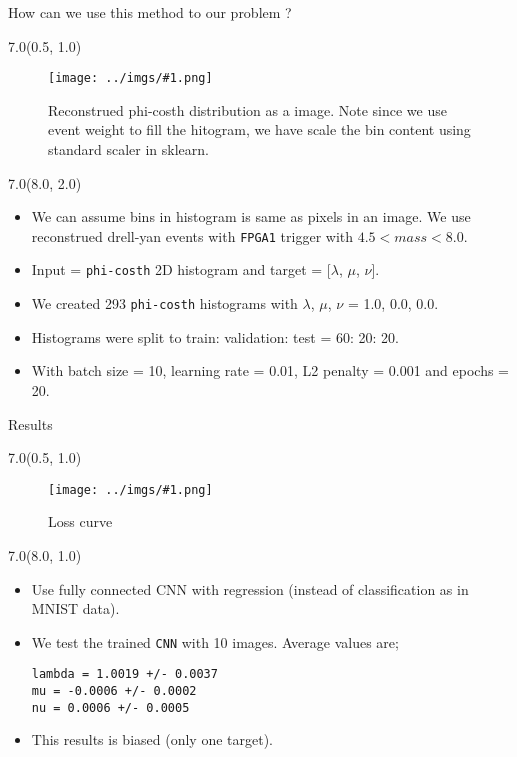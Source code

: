\documentclass[10pt, xcolor={dvipsnames}, aspectratio = 169, sans,mathserif]{beamer}
\newcommand{\leftpic}[2]
{
\begin{textblock}{7.0}(0.5, 1.0)
\begin{figure}
    \centering
    \texttt{[image: ../imgs/\#1.png]}
    \caption{#2}
\end{figure}
\end{textblock}
}
\begin{document}
\begin{frame}[fragile]{How can we use this method to our problem ?}

\leftpic{gray_pic}{Reconstrued phi-costh distribution as a image. Note since we use event weight to fill the hitogram, we have scale the bin content using standard scaler in sklearn.}

\begin{textblock}{7.0}(8.0, 2.0)
\begin{itemize}
    \item We can assume bins in histogram is same as pixels in an image. We use reconstrued drell-yan events with \verb|FPGA1| trigger with $4.5 < mass < 8.0$.

    \item Input = \verb|phi-costh| 2D histogram and target = [$\lambda$, $\mu$, $\nu$].

    \item We created 293 \verb|phi-costh| histograms with $\lambda$, $\mu$, $\nu$ = 1.0, 0.0, 0.0.

    \item Histograms were split to train: validation: test = 60: 20: 20.

    \item With batch size = 10, learning rate = 0.01, L2 penalty =  0.001 and epochs = 20.
\end{itemize}
\end{textblock}

\end{frame}

\begin{frame}[fragile]{Results}

\leftpic{loss_curve}{Loss curve}

\begin{textblock}{7.0}(8.0, 1.0)
\begin{itemize}

    \item Use fully connected CNN with regression (instead of classification as in MNIST data).

    \item We test the trained \verb|CNN| with 10 images. Average values are;

    \begin{verbatim}
lambda = 1.0019 +/- 0.0037
mu = -0.0006 +/- 0.0002
nu = 0.0006 +/- 0.0005
    \end{verbatim}

    \item This results is biased (only one target).

\end{itemize}
\end{textblock}

\end{frame}
\end{document}
